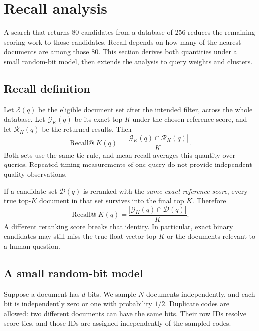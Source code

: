 \section{Recall analysis}
\label{sec:recall}
A search that returns 80 candidates from a database of 256 reduces the remaining scoring
work to those candidates. Recall depends on how many of the nearest documents are among
those 80. This section derives both quantities under a small random-bit model, then extends
the analysis to query weights and clusters.

\subsection{Recall definition}
Let $\mathcal E(q)$ be the eligible document set after the intended filter, across the whole
database. Let $\mathcal G_K(q)$ be its exact top $K$ under the chosen reference score, and let
$\mathcal R_K(q)$ be the returned results. Then
\begin{equation}
\operatorname{Recall@}K(q)=
\frac{|\mathcal G_K(q)\cap\mathcal R_K(q)|}{K}.
\label{eq:recall-exact}
\end{equation}
Both sets use the same tie rule, and mean recall averages this quantity over queries.
Repeated timing measurements of one query do not provide independent quality observations.

If a candidate set $\mathcal D(q)$ is reranked with the \emph{same exact reference score}, every
true top-$K$ document in that set survives into the final top $K$. Therefore
\begin{equation}
\operatorname{Recall@}K(q)=\frac{|\mathcal G_K(q)\cap\mathcal D(q)|}{K}.
\label{eq:candidate-recall}
\end{equation}
A different reranking score breaks that identity. In particular, exact binary candidates may
still miss the true float-vector top $K$ or the documents relevant to a human question.


\subsection{A small random-bit model}
Suppose a document has $d$ bits. We sample $N$ documents independently, and each bit is
independently zero or one with probability $1/2$. Duplicate codes are allowed: two different
documents can have the same bits. Their row IDs resolve score ties, and those IDs are assigned
independently of the sampled codes.

